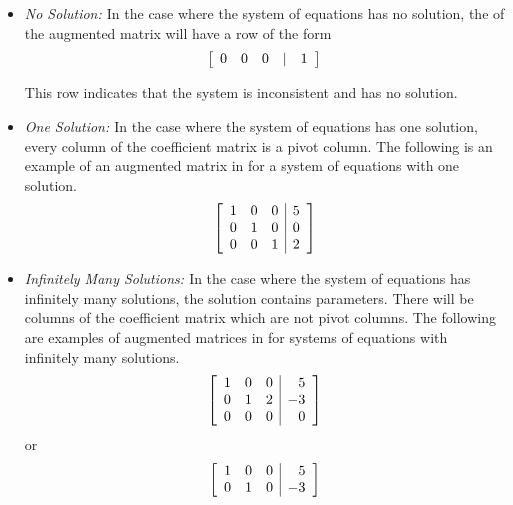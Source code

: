 \begin{itemize}
\item {\em No Solution: \em}
In the case where the system of equations has no solution, the \ef \; of the augmented matrix will have a row of the form 
\[
\left[
\begin{array}{rrrrr}
0 & 0 & 0 & | & 1
\end{array}
\right]
\]

This row indicates that the system is inconsistent and has no solution.

\item {\em One Solution: \em}
In the case where the system of equations has one solution, every column
of the coefficient matrix is a pivot column. 
The following is an example of an augmented matrix in \rref \hspace{0.5mm} for a system of equations with one solution. 
\begin{equation*}
\left[
\begin{array}{rrr|r}
1 & 0 & 0 & 5 \\
0 & 1 & 0 & 0 \\ 
0 & 0 & 1 & 2 
\end{array}
\right]
\end{equation*}

\item {\em Infinitely Many Solutions: \em} 
In the case where the system of equations has infinitely many solutions, the solution contains parameters. There
will be columns of the coefficient matrix which are not pivot columns.
The following are examples of augmented matrices in \rref \;for systems of equations with infinitely many solutions. 
\begin{equation*}
\left[
\begin{array}{rrr|r}
1 & 0 & 0 & 5 \\
0 & 1 & 2 & -3 \\ 
0 & 0 & 0 & 0 
\end{array}
\right]
\end{equation*}
or
\begin{equation*}
\left[
\begin{array}{rrr|r}
1 & 0 & 0 & 5 \\
0 & 1 & 0 & -3
\end{array}
\right]
\end{equation*}

\end{itemize}